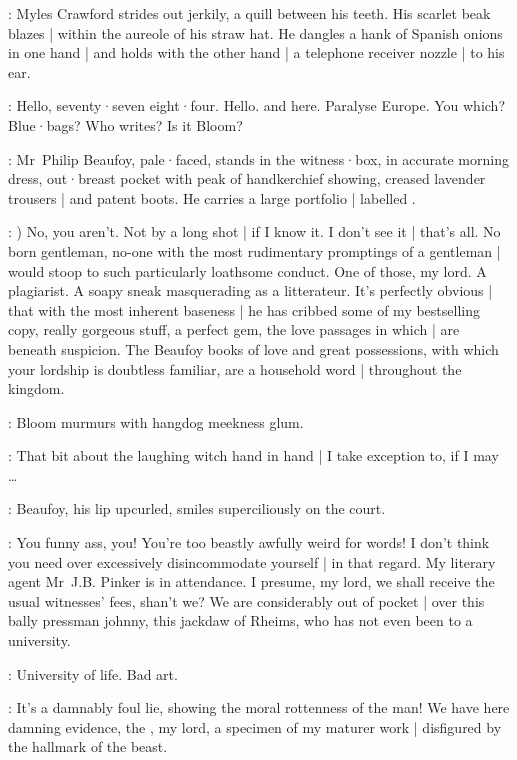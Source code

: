 :
Myles Crawford strides out jerkily,
a quill between his teeth.
His scarlet beak blazes |
within the aureole of his straw hat.
He dangles a hank of Spanish onions in one hand |
and holds with the other hand |
a telephone receiver nozzle |
to his ear.

\Myles:
Hello,
seventy·seven eight·four.
Hello.
and 
here.
Paralyse Europe.
You which?
Blue·bags?
Who writes?
Is it Bloom?

:
Mr~Philip Beaufoy,
pale·faced,
stands in the witness·box,
in accurate morning dress,
out·breast pocket with peak of handkerchief showing,
creased lavender trousers |
and patent boots.
He carries a large portfolio |
labelled .

\Beaufoy:
)
No,
you aren't.
Not by a long shot |
if I know it.
I don't see it |
that's all.
No born gentleman,
no-one with the most rudimentary promptings of a gentleman |
would stoop to such particularly loathsome conduct.
One of those,
my lord.
A plagiarist.
A soapy sneak masquerading as a litterateur.
It's perfectly obvious |
that with the most inherent baseness |
he has cribbed some of my bestselling copy,
really gorgeous stuff,
a perfect gem,
the love passages in which |
are beneath suspicion.
The Beaufoy books of love and great possessions,
with which your lordship is doubtless familiar,
are a household word |
throughout the kingdom.

:
Bloom murmurs with hangdog meekness glum.

\Bloom:
That bit about the laughing witch
hand in hand |
I take exception to,
if I may \ldots

:
Beaufoy,
his lip upcurled,
smiles superciliously on the court.

\Beaufoy:
You funny ass,
you!
You're too beastly awfully weird for words!
I don't think you need over excessively disincommodate yourself |
in that regard.
My literary agent Mr~J.B. Pinker is in attendance.
I presume,
my lord,
we shall receive the usual witnesses' fees,
shan't we?
We are considerably out of pocket |
over this bally pressman johnny,
this jackdaw of Rheims,
who has not even been to a university.

\Bloom:
University of life.
Bad art.

\Beaufoy:
It's a damnably foul lie,
showing the moral rottenness of the man!
We have here damning evidence,
the ,
my lord,
a specimen of my maturer work |
disfigured by the hallmark of the beast.

